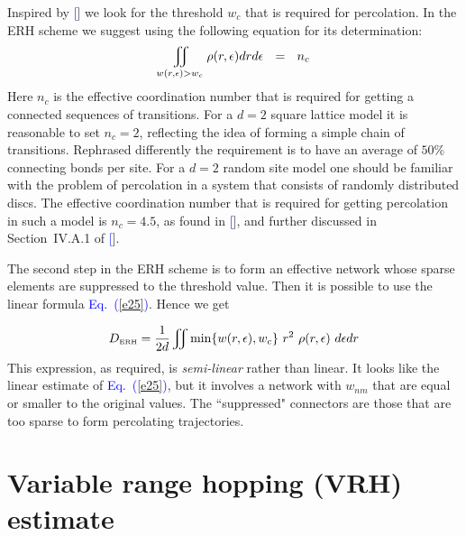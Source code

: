 \documentclass[aps,pre,floats,floatfix,twocolumn]{revtex4}
\newcommand{\tbox}[1]{\mbox{\tiny #1}}
\newcommand{\mylabel}[1]{\label{#1}}
\newcommand{\eeq}{\end{eqnarray}}
\newcommand{\be}[1]{\begin{eqnarray}\ifthenelse{#1=-1}
{\nonumber}{\ifthenelse{#1=0}{}{\mylabel{e#1}}}}
\newcommand{\Eq}[1]{\textcolor{blue}{Eq.\!\!~(\ref{#1})}}
\newcommand{\rmrk}[1]{#1}
\renewcommand{\cite}[1]{\textcolor{blue}{[\onlinecite{#1}}]} %
\begin{document}
Inspired by \cite{AHL,Halp,pollak} we look for the threshold $w_c$ 
that is required for percolation. In the ERH scheme 
we suggest using the following equation for its determination: 
%
\be{30}
\iint_{w(r,\epsilon)>w_c} \rho(r,\epsilon)drd\epsilon \ \ = \ \ n_c
\eeq
%
Here $n_c$ is the effective coordination number that is 
required for getting a connected sequences of transitions.
%
For a $d{=}2$ square lattice model it is reasonable to set $n_c=2$, 
reflecting the idea of forming a simple chain of transitions. 
Rephrased differently the requirement is to have an average of $50\%$ 
connecting bonds per site. 
%
\rmrk{For a $d{=}2$ random site model one should be familiar 
with the problem of percolation in a system that consists 
of randomly distributed discs.} 
The effective coordination number that is required for getting 
percolation in such a model is ${n_c=4.5}$, as found in \cite{Dalton}, 
and further discussed in Section~IV.A.1 of \cite{Pike}.   


The second step in the ERH scheme is to form an effective 
network whose sparse elements are suppressed to the threshold value.  
Then it is possible to use the linear formula \Eq{e25}. Hence we get 

%
\be{31}
D_{\tbox{ERH}} = \frac{1}{2d}\iint \min\{w(r,\epsilon),w_c\} \ r^2  \ \rho(r,\epsilon) \ d\epsilon dr
\eeq
%
This expression, as required, is {\em semi-linear} rather than linear. 
It looks like the linear estimate of \Eq{e25}, but it involves a network 
with $w_{nm}$ that are equal or smaller to the original values.
The ``suppressed" connectors are those that are too sparse 
to form percolating trajectories. 


\section{Variable range hopping (VRH) estimate}
\end{document}
